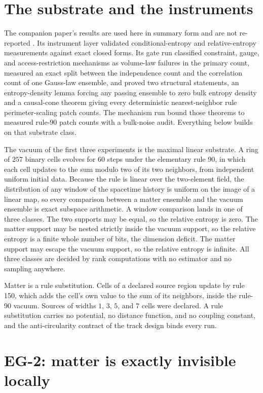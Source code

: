 \documentclass[aps,pre,reprint,nofootinbib]{revtex4-2}
\begin{document}
\section{The substrate and the instruments}
\label{sec:substrate}

The companion paper's results are used here in summary form and are
not re-reported \cite{AreaGatePaper}.  Its instrument layer validated
conditional-entropy and relative-entropy measurements against exact
closed forms.  Its gate run classified constraint, gauge, and
access-restriction mechanisms as volume-law failures in the primary
count, measured an exact split between the independence count and the
correlation count of one Gauss-law ensemble, and proved two
structural statements, an entropy-density lemma forcing any passing
ensemble to zero bulk entropy density and a causal-cone theorem
giving every deterministic nearest-neighbor rule perimeter-scaling
patch counts.  The mechanism run bound those theorems to measured
rule-90 patch counts with a bulk-noise audit.  Everything below
builds on that substrate class.

The vacuum of the first three experiments is the maximal linear
substrate.  A ring of $257$ binary cells evolves for $60$ steps under
the elementary rule 90, in which each cell updates to the sum modulo
two of its two neighbors, from independent uniform initial data.
Because the rule is linear over the two-element field, the
distribution of any window of the spacetime history is uniform on the
image of a linear map, so every comparison between a matter ensemble
and the vacuum ensemble is exact subspace arithmetic.  A window
comparison lands in one of three classes.  The two supports may be
equal, so the relative entropy is zero.  The matter support may be
nested strictly inside the vacuum support, so the relative entropy is
a finite whole number of bits, the dimension deficit.  The matter
support may escape the vacuum support, so the relative entropy is
infinite.  All three classes are decided by rank computations with no
estimator and no sampling anywhere.

Matter is a rule substitution.  Cells of a declared source region
update by rule 150, which adds the cell's own value to the sum of its
neighbors, inside the rule-90 vacuum.  Sources of widths $1$, $3$,
$5$, and $7$ cells were declared.  A rule substitution carries no
potential, no distance function, and no coupling constant, and the
anti-circularity contract of the track design binds every run.

\section{EG-2: matter is exactly invisible locally}
\label{sec:eg2}
\end{document}
